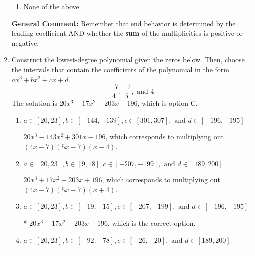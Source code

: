 \documentclass{extbook}[14pt]
\newcommand{\litem}[1]{\item #1

\rule{\textwidth}{0.4pt}}
\begin{document}
\begin{enumerate}
{\begin{enumerate}[label=\Alph*.]
\item None of the above.\end{enumerate}
\textbf{General Comment:} Remember that end behavior is determined by the leading coefficient AND whether the \textbf{sum} of the multiplicities is positive or negative.
}
\litem{
Construct the lowest-degree polynomial given the zeros below. Then, choose the intervals that contain the coefficients of the polynomial in the form $ax^3+bx^2+cx+d$.
\[ \frac{-7}{4}, \frac{-7}{5}, \text{ and } 4 \]The solution is \( 20x^{3} -17 x^{2} -203 x -196 \), which is option C.\begin{enumerate}[label=\Alph*.]
\item \( a \in [20, 23], b \in [-144, -139], c \in [301, 307], \text{ and } d \in [-196, -195] \)

$20x^{3} -143 x^{2} +301 x -196$, which corresponds to multiplying out $(4x -7)(5x -7)(x -4)$.
\item \( a \in [20, 23], b \in [9, 18], c \in [-207, -199], \text{ and } d \in [189, 200] \)

$20x^{3} +17 x^{2} -203 x + 196$, which corresponds to multiplying out $(4x -7)(5x -7)(x + 4)$.
\item \( a \in [20, 23], b \in [-19, -15], c \in [-207, -199], \text{ and } d \in [-196, -195] \)

* $20x^{3} -17 x^{2} -203 x -196$, which is the correct option.
\item \( a \in [20, 23], b \in [-92, -78], c \in [-26, -20], \text{ and } d \in [189, 200] \)


\end{enumerate}}
\end{enumerate}
\end{document}
